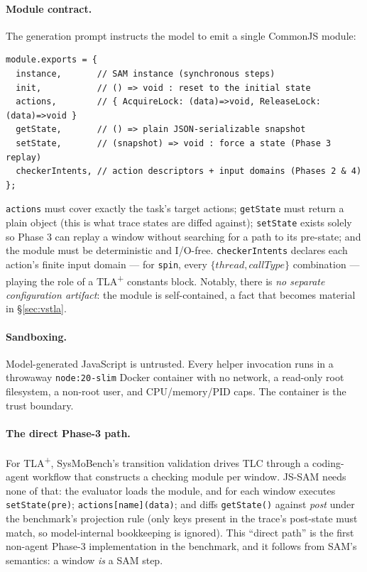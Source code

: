 \documentclass[11pt]{article}
\newcommand{\jssam}{JS-SAM}
\newcommand{\tlaplus}{TLA\texorpdfstring{\textsuperscript{+}}{+}}
\begin{document}
\paragraph{Module contract.}
The generation prompt instructs the model to emit a single CommonJS module:

\begin{lstlisting}[style=code]
module.exports = {
  instance,       // SAM instance (synchronous steps)
  init,           // () => void : reset to the initial state
  actions,        // { AcquireLock: (data)=>void, ReleaseLock: (data)=>void }
  getState,       // () => plain JSON-serializable snapshot
  setState,       // (snapshot) => void : force a state (Phase 3 replay)
  checkerIntents, // action descriptors + input domains (Phases 2 & 4)
};
\end{lstlisting}

\noindent
\texttt{actions} must cover exactly the task's target actions;
\texttt{getState} must return a plain object (this is what trace states are
diffed against); \texttt{setState} exists solely so Phase 3 can replay a
window without searching for a path to its pre-state; and the module must be
deterministic and I/O-free. \texttt{checkerIntents} declares each action's
finite input domain --- for \texttt{spin}, every
$\{\mathit{thread}, \mathit{callType}\}$ combination --- playing the role of a
\tlaplus{} constants block. Notably, there is \emph{no separate configuration
artifact}: the module is self-contained, a fact that becomes material in
\S\ref{sec:vstla}.

\paragraph{Sandboxing.}
Model-generated JavaScript is untrusted. Every helper invocation runs in a
throwaway \texttt{node:20-slim} Docker container with no network,
a read-only root filesystem, a non-root user, and CPU/memory/PID caps. The
container is the trust boundary.

\paragraph{The direct Phase-3 path.}
For \tlaplus{}, SysMoBench's transition validation drives TLC through a
coding-agent workflow that constructs a checking module per window. \jssam{}
needs none of that: the evaluator loads the module, and for each window
executes \texttt{setState(pre)}; \texttt{actions[name](data)}; and diffs
\texttt{getState()} against \emph{post} under the benchmark's projection rule
(only keys present in the trace's post-state must match, so model-internal
bookkeeping is ignored). This ``direct path'' is the first non-agent Phase-3
implementation in the benchmark, and it follows from SAM's semantics: a
window \emph{is} a SAM step.
\end{document}
